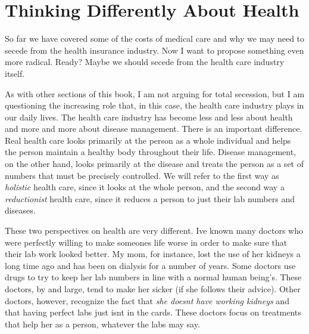 \documentclass[letterpaper]{article}
\begin{document}
\section[Thinking Differently About Health]{Thinking Differently About
Health}
{\color{black}
So far we have covered some of the costs of medical care and why we may
need to secede from the health insurance industry. Now I want to
propose something
\textcolor[rgb]{0.32941177,0.5529412,0.83137256}{even} more
radical\textcolor[rgb]{0.32941177,0.5529412,0.83137256}{. Ready? M}aybe
we should secede from the health care industry itself.}

{\color{black}
\textcolor[rgb]{0.32941177,0.5529412,0.83137256}{As with other sections
}of this book, I am not arguing for total
secession\textcolor[rgb]{0.32941177,0.5529412,0.83137256}{,} but 
\textcolor[rgb]{0.32941177,0.5529412,0.83137256}{I am }questioning the
increasing role that\textcolor[rgb]{0.32941177,0.5529412,0.83137256}{,
in this case,} the health care industry plays in our daily lives. The
health care industry has become less and less about health and more and
more about disease management. There is an important difference. Real
health care looks primarily at the person as a whole individual and
helps the person maintain a healthy body throughout their life. Disease
management, on the other hand, looks primarily at the disease and
treats the person as a set of numbers that must be precisely
controlled. We will refer to the first way as \textit{holistic} health
care, since it looks at the whole person, and the second way a
\textit{reductionist} health care, since it reduces a person to just
their lab numbers and diseases.}

{\color{black}
These two perspectives on health are very different.
I{\textquotesingle}ve known many doctors who were perfectly willing to
make someone{\textquotesingle}s life worse in order to make sure that
their lab work looked better. My mom, for instance, lost the use of her
kidneys a long time ago and has been on dialysis for a number of years.
Some doctors use drugs to try to keep her lab numbers in line with a
normal human being’s. These doctors, by and large, tend to make her
sicker (if she follows their advice). Other doctors, however, recognize
the fact that \textit{she doesn{\textquotesingle}t have working
kidneys} and that having perfect labs just isn{\textquotesingle}t in
the cards.  These doctors focus on treatments that help her as a
person, whatever the labs may say.}
\end{document}
